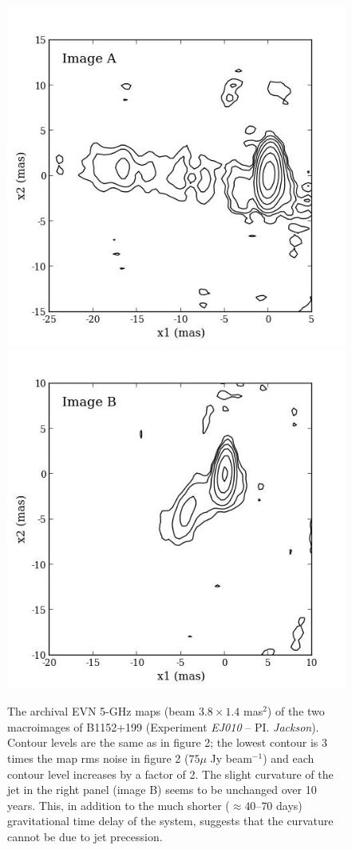 \documentclass[a4paper, 11pt]{article}
\begin{document}
\begin{figure}[tbh]
\centering
\includegraphics[scale=0.35]{Figure_2012A.jpg}
\includegraphics[scale=0.35]{Figure_2012B.jpg}
\caption{The archival EVN 5-GHz maps (beam $3.8 \times 1.4$ mas$^2$) of the two macroimages of B1152+199 (Experiment \emph{EJ010} -- PI. \emph{Jackson}). Contour levels are the same as in figure 2; the lowest contour is 3 times the map rms noise in figure 2 ($75 \mu$ Jy beam$^{-1}$) and each contour level increases by a factor of 2. The slight curvature of the jet in the right panel (image B) seems to be unchanged over 10 years. This, in addition to the much shorter ($\approx 40$--$70$ days) gravitational time delay of the system, suggests that the curvature cannot be due to jet precession.}
\end{figure}
\end{document}
